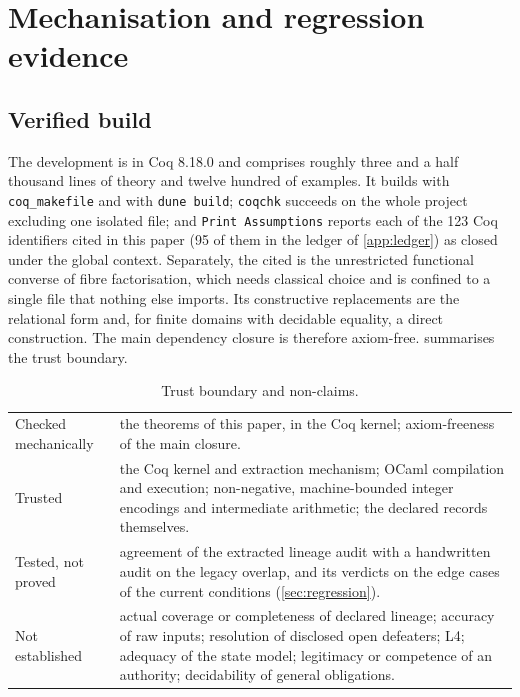 \section{Mechanisation and regression evidence}\label{sec:mechanisation}

\subsection{Verified build}
The development is in Coq 8.18.0 \cite{coq818} and comprises roughly three and a half thousand lines of theory and twelve hundred of examples. It builds with \texttt{coq\_makefile} and with \texttt{dune build}; \texttt{coqchk} succeeds on the whole project excluding one isolated file; and \texttt{Print Assumptions} reports each of the 123 Coq identifiers cited in this paper (95 of them in the ledger of \cref{app:ledger}) as closed under the global context. Separately, the cited  is the unrestricted functional converse of fibre factorisation, which needs classical choice and is confined to a single file that nothing else imports. Its constructive replacements are the relational form and, for finite domains with decidable equality, a direct construction. The main dependency closure is therefore axiom-free.  summarises the trust boundary.
\begin{table}[t]
\centering\small
\caption{Trust boundary and non-claims.}\label{tab:trust}
\begin{tabularx}{\textwidth}{@{}lY@{}}
\toprule
Checked mechanically & the theorems of this paper, in the Coq kernel; axiom-freeness of the main closure. \\
Trusted & the Coq kernel and extraction mechanism; OCaml compilation and execution; non-negative, machine-bounded integer encodings and intermediate arithmetic; the declared records themselves. \\
Tested, not proved & agreement of the extracted lineage audit with a handwritten audit on the legacy overlap, and its verdicts on the edge cases of the current conditions (\cref{sec:regression}). \\
Not established & actual coverage or completeness of declared lineage; accuracy of raw inputs; resolution of disclosed open defeaters; L4; adequacy of the state model; legitimacy or competence of an authority; decidability of general obligations. \\
\bottomrule
\end{tabularx}
\end{table}

